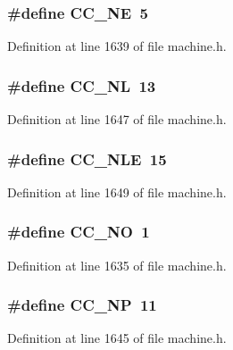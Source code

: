 \subsubsection[{CC\_\-NE}]{\setlength{\rightskip}{0pt plus 5cm}\#define CC\_\-NE~5}\label{machine_8h_98926d4e80b33d7b47617642fd7aaa24}




Definition at line 1639 of file machine.h.
\subsubsection[{CC\_\-NL}]{\setlength{\rightskip}{0pt plus 5cm}\#define CC\_\-NL~13}\label{machine_8h_404b0c22d1f7938c28664b07d7a93566}




Definition at line 1647 of file machine.h.
\subsubsection[{CC\_\-NLE}]{\setlength{\rightskip}{0pt plus 5cm}\#define CC\_\-NLE~15}\label{machine_8h_a2f3473aa0b4840adff76ffa49a42b0f}




Definition at line 1649 of file machine.h.
\subsubsection[{CC\_\-NO}]{\setlength{\rightskip}{0pt plus 5cm}\#define CC\_\-NO~1}\label{machine_8h_be89b2b99bae311798eafff28172b019}




Definition at line 1635 of file machine.h.
\subsubsection[{CC\_\-NP}]{\setlength{\rightskip}{0pt plus 5cm}\#define CC\_\-NP~11}\label{machine_8h_f93f966dad7a3a1ea2d9541d9796d704}




Definition at line 1645 of file machine.h.
